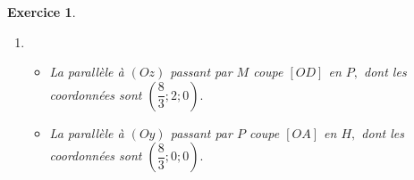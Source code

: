 \documentclass[10pt]{article}
\newtheorem{exo}{Exercice}
\begin{document}
\begin{exo}
\begin{multicols}{2}
\begin{enumerate}
\begin{align*}&\overrightarrow{CD}\begin{pmatrix} 4-0
\\3-0\\0-4 \end{pmatrix}\qquad \overrightarrow{CD}\begin{pmatrix} 4
\\3\\-4 \end{pmatrix}\\
&\overrightarrow{CM}\begin{pmatrix} \dfrac{8}{3}-0
\\2-0\\ \dfrac{4}{3}-4 \end{pmatrix}\qquad \overrightarrow{CM}\begin{pmatrix} \dfrac{8}{3}
\\2\\ \dfrac{4}{3}-\dfrac{12}{3} \end{pmatrix}
\qquad \overrightarrow{CM}\begin{pmatrix} \dfrac{8}{3}
\\2\\ -\dfrac{8}{3} \end{pmatrix}.
\end{align*}

On voit que $\overrightarrow{CM}=\dfrac{2}{3}\overrightarrow{CD},$ donc $M$ appartient au segment $\left[CD\right]~;$ et il est aux $2/3$ de ce segment en partant de $C.$

\item \begin{itemize}
\item[\textbullet] La parallèle à $(Oz)$ passant par $M$ coupe $\left[OD\right]$ en $P,$ dont les coordonnées sont $\left(\dfrac{8}{3};2;0\right).$
 \item[\textbullet] La parallèle à $(Oy)$ passant par $P$ coupe $\left[OA\right]$ en $H,$ dont les coordonnées sont $\left(\dfrac{8}{3};0;0\right).$
\end{itemize}

\end{enumerate}
\end{multicols}

\end{exo}
\end{document}
